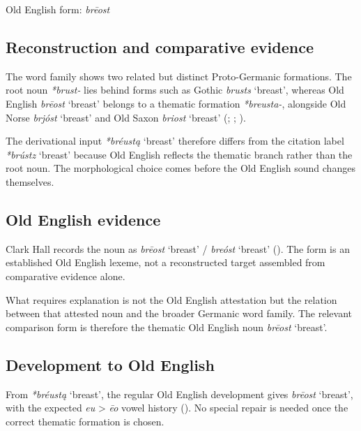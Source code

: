 \documentclass[
  british,
  a4paper,
  openany]{book}
\providecommand{\Recon}[1]{\emph{*#1}}
{\catcode`→=\active \global\def→{\ensuremath{\rightarrow}}}
\providecommand{\Recon}[1]{\emph{*#1}}
{\catcode`→=\active \global\def→{\ensuremath{\rightarrow}}}
\begin{document}
Old English form: \emph{brēost}

\subsection{Reconstruction and comparative
evidence}\label{reconstruction-and-comparative-evidence-76}

The word family shows two related but distinct Proto-Germanic
formations. The root noun {\emph{*brust-}} lies behind forms such as
Gothic {\emph{brusts}} `breast', whereas Old English {\emph{brēost}}
`breast' belongs to a thematic formation {\emph{*breusta-}}, alongside
Old Norse {\emph{brjóst}} `breast' and Old Saxon {\emph{briost}}
`breast' (;
;
).

The derivational input {\Recon{bréustą} `breast'} therefore differs from
the citation label {\Recon{brústz} `breast'} because Old English
reflects the thematic branch rather than the root noun. The
morphological choice comes before the Old English sound changes
themselves.

\subsection{Old English evidence}\label{old-english-evidence-76}

Clark Hall records the noun as {\emph{brēost}} `breast' /
{\emph{breóst}} `breast' (). The form is an established Old English lexeme, not a reconstructed
target assembled from comparative evidence alone.

What requires explanation is not the Old English attestation but the
relation between that attested noun and the broader Germanic word
family. The relevant comparison form is therefore the thematic Old
English noun {\emph{brēost}} `breast'.

\subsection{Development to Old
English}\label{development-to-old-english-76}

From {\Recon{bréustą} `breast'}, the regular Old English development
gives {\emph{brēost}} `breast', with the expected \emph{eu}
\textgreater{} \emph{ēo} vowel history
(). No special
repair is needed once the correct thematic formation is chosen.
\end{document}
